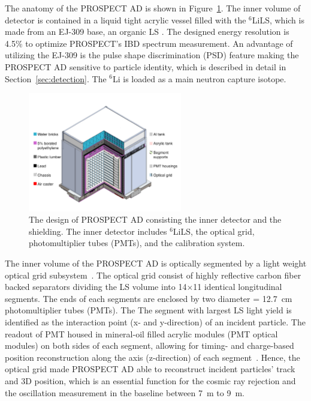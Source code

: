     The anatomy of the PROSPECT AD is shown in Figure~\ref{fig:PROSPECT_AD}.
    The inner volume of detector is contained in a liquid tight acrylic vessel filled with the $^{6}$LiLS, which is made from an EJ-309 base, an organic LS \cite{bib:lspaper}.
    The designed energy resolution is 4.5\% to optimize PROSPECT's IBD spectrum measurement.
    An advantage of utilizing the EJ-309 is the pulse shape discrimination (PSD) feature making the PROSPECT AD sensitive to particle identity, which is described in detail in Section~\ref{sec:detection}.
    The $^{6}$Li is loaded as a main neutron capture isotope.

\begin{figure}
    \centering
    \includegraphics[trim = 0cm 2cm 0cm 2cm, clip,width=0.6\textwidth]{Figures/DetectorDesign.pdf}
    \caption[The design of PROSPECT AD]{The design of PROSPECT AD consisting the inner detector and the shielding.
    The inner detector includes $^{6}$LiLS, the optical grid, photomultiplier tubes (PMTs), and the calibration system.
    }
    \label{fig:PROSPECT_AD}
\end{figure}

    The inner volume of the PROSPECT AD is optically segmented by a light weight optical grid subsystem~\cite{bib:prospect_og}.
    The optical grid consist of highly reflective carbon fiber backed separators dividing the LS volume into 14$\times$11 identical longitudinal segments. 
    The ends of each segments are enclosed by two diameter = 12.7~cm photomultiplier tubes (PMTs).
    The 
    The segment with largest LS light yield is identified as the interaction point (x- and y-direction) of an incident particle.
    The readout of PMT housed in mineral-oil filled acrylic modules (PMT optical modules) on both sides of each segment, allowing for timing- and charge-based position reconstruction along the axis (z-direction) of each segment~\cite{bib:prospect_50, bib:P20}.
    Hence, the optical grid made PROSPECT AD able to reconstruct incident particles' track and 3D position, which is an essential function for the cosmic ray rejection and the oscillation measurement in the baseline between 7~m to 9~m.
    
\label{sec:detection}

\label{sec:OG}




